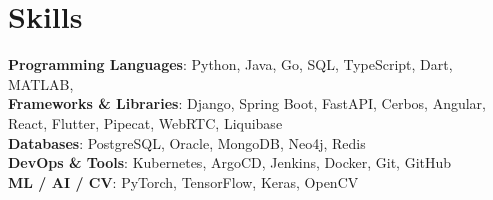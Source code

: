 \section{Skills}
\begin{itemize}[leftmargin=0.15in, label={}]
\small{\item{
     \textbf{Programming Languages}: Python, Java, Go, SQL, TypeScript, Dart, MATLAB, \\
     \textbf{Frameworks \& Libraries}: Django, Spring Boot, FastAPI, Cerbos, Angular, React, Flutter, Pipecat, WebRTC, Liquibase \\
     \textbf{Databases}: PostgreSQL, Oracle, MongoDB, Neo4j, Redis \\
     \textbf{DevOps \& Tools}: Kubernetes, ArgoCD, Jenkins, Docker, Git, GitHub \\
     \textbf{ML / AI / CV}: PyTorch, TensorFlow, Keras, OpenCV
}}
\end{itemize}

